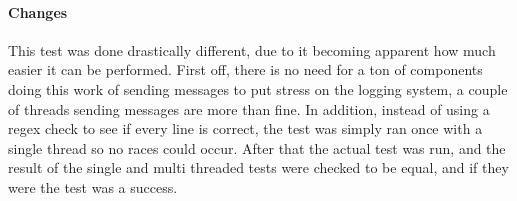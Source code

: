 \paragraph{Changes}
This test was done drastically different, due to it becoming apparent how much easier it can be performed.
First off, there is no need for a ton of components doing this work of sending messages to put stress on the logging system, a couple of threads sending messages are more than fine.
In addition, instead of using a regex check to see if every line is correct, the test was simply ran once with a single thread so no races could occur.
After that the actual test was run, and the result of the single and multi threaded tests were checked to be equal, and if they were the test was a success.
